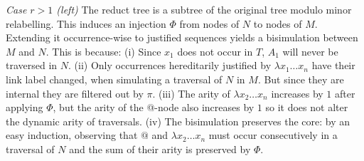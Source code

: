 \documentclass{elsarticle}
\theoremstyle{plain}
\theoremstyle{definition}
\def\coresymbol{\pi} %
\begin{document}
\fi
\noindent
\emph{Case $r>1$ (left)} The reduct tree is a subtree of the original tree modulo minor relabelling.
This induces an injection $\Phi$ from nodes of $N$ to nodes of $M$.
Extending it occurrence-wise to justified sequences
yields a bisimulation between $M$ and $N$.
This is because:
%
(i) Since $x_1$ does not occur in $T$, $A_1$ will never be traversed in $N$.
%
(ii) Only occurrences hereditarily justified by $\lambda x_1 \ldots x_n$ have their link label changed, when simulating a traversal of $N$ in $M$. But since they are internal they are filtered out by $\coresymbol$.
%
(iii) The arity of $\lambda x_2 \ldots x_n$ increases by $1$ after applying $\Phi$, but the arity of the @-node also increases by $1$ so it does
not alter the dynamic arity of traversals.
%
(iv) The bisimulation preserves the core: by an easy induction, observing that $@$ and $\lambda x_2\ldots x_n$ must occur consecutively in a traversal of $N$ and the sum of their arity is preserved by $\Phi$.
\end{document}
